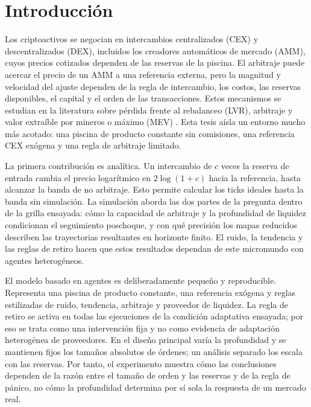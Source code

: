 \chapter{Introducción}
\label{cap:introduccion}

Los criptoactivos se negocian en intercambios centralizados (CEX) y descentralizados (DEX), incluidos los creadores automáticos de mercado (AMM), cuyos precios cotizados dependen de las reservas de la piscina. El arbitraje puede acercar el precio de un AMM a una referencia externa, pero la magnitud y velocidad del ajuste dependen de la regla de intercambio, los costos, las reservas disponibles, el capital y el orden de las transacciones. Estos mecanismos se estudian en la literatura sobre pérdida frente al rebalanceo (LVR), arbitraje y valor extraíble por mineros o máximo (MEV) \cite{milionis2022lvr,daian2020flash,zhou2021hft}. Esta tesis aísla un entorno mucho más acotado: una piscina de producto constante sin comisiones, una referencia CEX exógena y una regla de arbitraje limitado.

La primera contribución es analítica. Un intercambio de $c$ veces la reserva de entrada cambia el precio logarítmico en $2\log(1+c)$ hacia la referencia, hasta alcanzar la banda de no arbitraje. Esto permite calcular los ticks ideales hasta la banda sin simulación. La simulación aborda las dos partes de la pregunta dentro de la grilla ensayada: cómo la capacidad de arbitraje y la profundidad de liquidez condicionan el seguimiento poschoque, y con qué precisión los mapas reducidos describen las trayectorias resultantes en horizonte finito. El ruido, la tendencia y las reglas de retiro hacen que estos resultados dependan de este micromundo con agentes heterogéneos.

El modelo basado en agentes es deliberadamente pequeño y reproducible. Representa una piscina de producto constante, una referencia exógena y reglas estilizadas de ruido, tendencia, arbitraje y proveedor de liquidez. La regla de retiro se activa en todas las ejecuciones de la condición adaptativa ensayada; por eso se trata como una intervención fija y no como evidencia de adaptación heterogénea de proveedores. En el diseño principal varía la profundidad y se mantienen fijos los tamaños absolutos de órdenes; un análisis separado los escala con las reservas. Por tanto, el experimento muestra cómo las conclusiones dependen de la razón entre el tamaño de orden y las reservas y de la regla de pánico, no cómo la profundidad determina por sí sola la respuesta de un mercado real.

